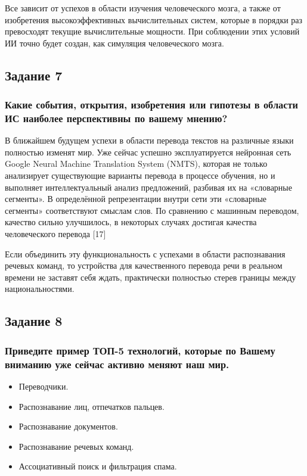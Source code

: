 \documentclass[14pt,a4paper,report]{report}
\begin{document}
Все зависит от успехов в области изучения человеческого мозга, а также от изобретения высокоэффективных вычислительных систем, которые в порядки раз превосходят текущие вычислительные мощности. При соблюдении этих условий ИИ точно будет создан, как симуляция человеческого мозга.

\subsection{Задание 7}

\subsubsection{Какие события, открытия, изобретения или гипотезы в области ИС наиболее перспективны по вашему мнению?}

В ближайшем будущем успехи в области перевода текстов на различные языки полностью изменят мир. Уже сейчас успешно эксплуатируется нейронная сеть Google Neural Machine Translation System (NMTS), которая не только анализирует существующие варианты перевода в процессе обучения, но и выполняет интеллектуальный анализ предложений, разбивая их на «словарные сегменты». В определённой репрезентации внутри сети эти «словарные сегменты» соответствуют смыслам слов. По сравнению с машинным переводом, качество сильно улучшилось, в некоторых случаях достигая качества человеческого перевода [17]

Если объединить эту функциональность с успехами в области распознавания речевых команд, то устройства для качественного перевода речи в реальном времени не заставят себя ждать, практически полностью стерев границы между национальностями.

\subsection{Задание 8}

\subsubsection{Приведите пример ТОП-5 технологий, которые по Вашему вниманию уже сейчас активно меняют наш мир.}

\begin{itemize}
	\item Переводчики.
	\item Распознавание лиц, отпечатков пальцев.
	\item Распознавание документов.
	\item Распознавание речевых команд.
	\item Ассоциативный поиск и фильтрация спама.
\end{itemize}
\end{document}
